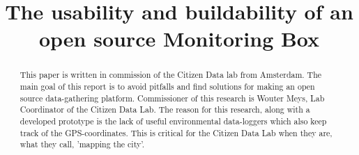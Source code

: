 \documentclass[conference]{IEEEtran}
\begin{document}
\title{The usability and buildability of an open source Monitoring Box}

\author{
	\and
		\and
		}
\maketitle	

\begin{abstract}
This paper is written in commission of the Citizen Data lab from Amsterdam. The main goal of this report is to avoid pitfalls and find solutions for making an open source data-gathering platform. Commissioner of this research is Wouter Meys, Lab Coordinator of the Citizen Data Lab. The reason for this research, along with a developed prototype is the lack of useful environmental data-loggers which also keep track of the GPS-coordinates. This is critical for the Citizen Data Lab when they are, what they call, 'mapping the city'. \\

\end{abstract}
\end{document}
